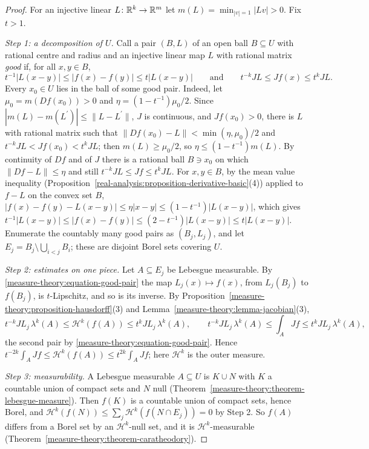 \begin{proof}
For an injective linear $L \colon \mathbb{R}^k \to \mathbb{R}^m$ let $m(L) = \min_{|v| = 1}|Lv| > 0$. Fix $t > 1$.

\emph{Step 1: a decomposition of $U$.} Call a pair $(B, L)$ of an open ball $B \subseteq U$ with rational centre and radius and an injective linear map $L$ with rational matrix \emph{good} if, for all
$x, y \in B$,
\begin{equation}\label{measure-theory:equation-good-pair}
t^{-1}|L(x - y)| \leq |f(x) - f(y)| \leq t|L(x - y)| \qquad\text{and}\qquad t^{-k}JL \leq Jf(x) \leq t^kJL .
\end{equation}
Every $x_0 \in U$ lies in the ball of some good pair. Indeed, let $\mu_0 = m(Df(x_0)) > 0$ and $\eta = (1 - t^{-1})\mu_0/2$. Since $|m(L) - m(L^{\prime})| \leq \|L - L^{\prime}\|$, $J$ is
continuous, and $Jf(x_0) > 0$, there is $L$ with rational matrix such that $\|Df(x_0) - L\| < \min(\eta, \mu_0)/2$ and $t^{-k}JL < Jf(x_0) < t^kJL$; then $m(L) \geq \mu_0/2$, so
$\eta \leq (1 - t^{-1})m(L)$. By continuity of $Df$ and of $J$ there is a rational ball $B \ni x_0$ on which $\|Df - L\| \leq \eta$ and still $t^{-k}JL \leq Jf \leq t^kJL$. For $x, y \in B$, by the mean value inequality (Proposition~\ref{real-analysis:proposition-derivative-basic}(4))
applied to $f - L$ on the convex set $B$, $|f(x) - f(y) - L(x - y)| \leq \eta|x - y| \leq (1 - t^{-1})|L(x - y)|$, which gives
$t^{-1}|L(x - y)| \leq |f(x) - f(y)| \leq (2 - t^{-1})|L(x - y)| \leq t|L(x - y)|$. Enumerate the countably many good pairs as $(B_j, L_j)$, and let $E_j = B_j \setminus \bigcup_{i < j}B_i$; these are
disjoint Borel sets covering $U$.

\emph{Step 2: estimates on one piece.} Let $A \subseteq E_j$ be Lebesgue measurable. By \eqref{measure-theory:equation-good-pair} the map $L_j(x) \mapsto f(x)$, from $L_j(B_j)$ to $f(B_j)$, is
$t$-Lipschitz, and so is its inverse. By Proposition~\ref{measure-theory:proposition-hausdorff}(3) and Lemma~\ref{measure-theory:lemma-jacobian}(3),
\[
t^{-k}JL_j\,\lambda^k(A) \leq \mathcal{H}^k(f(A)) \leq t^kJL_j\,\lambda^k(A), \qquad t^{-k}JL_j\,\lambda^k(A) \leq \int_AJf \leq t^kJL_j\,\lambda^k(A),
\]
the second pair by \eqref{measure-theory:equation-good-pair}. Hence $t^{-2k}\int_AJf \leq \mathcal{H}^k(f(A)) \leq t^{2k}\int_AJf$; here $\mathcal{H}^k$ is the outer measure.

\emph{Step 3: measurability.} A Lebesgue measurable $A \subseteq U$ is $K \cup N$ with $K$ a countable union of compact sets and $N$ null (Theorem~\ref{measure-theory:theorem-lebesgue-measure}).
Then $f(K)$ is a countable union of compact sets, hence Borel, and $\mathcal{H}^k(f(N)) \leq \sum_j\mathcal{H}^k(f(N \cap E_j)) = 0$ by Step 2. So $f(A)$ differs from a Borel set by an
$\mathcal{H}^k$-null set, and it is $\mathcal{H}^k$-measurable (Theorem~\ref{measure-theory:theorem-caratheodory}).


\end{proof}
